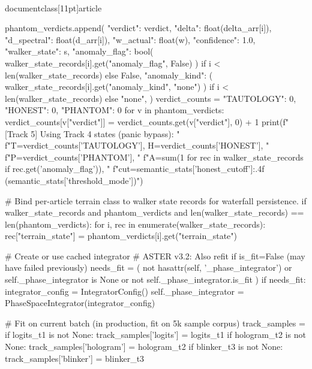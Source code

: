 \\documentclass[11pt]{article}
\begin{document}
\begin{CodeBlock}
                            phantom_verdicts.append({
                                "verdict": verdict,
                                "delta": float(delta_arr[i]),
                                "d_spectral": float(d_arr[i]),
                                "w_actual": float(w),
                                "confidence": 1.0,
                                "walker_state": s,
                                "anomaly_flag": bool(
                                    walker_state_records[i].get("anomaly_flag", False)
                                ) if i < len(walker_state_records) else False,
                                "anomaly_kind": (
                                    walker_state_records[i].get("anomaly_kind", "none")
                                ) if i < len(walker_state_records) else "none",
                            })
                        verdict_counts = {"TAUTOLOGY": 0, "HONEST": 0, "PHANTOM": 0}
                        for v in phantom_verdicts:
                            verdict_counts[v["verdict"]] = verdict_counts.get(v["verdict"], 0) + 1
                        print(f"[Track 5] Using Track 4 states (panic bypass): "
                              f"T={verdict_counts['TAUTOLOGY']}, H={verdict_counts['HONEST']}, "
                              f"P={verdict_counts['PHANTOM']}, "
                              f"A={sum(1 for rec in walker_state_records if rec.get('anomaly_flag'))}, "
                              f"cut={semantic_stats['honest_cutoff']:.4f} ({semantic_stats['threshold_mode']})")

                # Bind per-article terrain class to walker state records for waterfall persistence.
                if walker_state_records and phantom_verdicts and len(walker_state_records) == len(phantom_verdicts):
                    for i, rec in enumerate(walker_state_records):
                        rec["terrain_state"] = phantom_verdicts[i].get("terrain_state")

                # Create or use cached integrator
                # ASTER v3.2: Also refit if is_fit=False (may have failed previously)
                needs_fit = (
                    not hasattr(self, '_phase_integrator') or
                    self._phase_integrator is None or
                    not self._phase_integrator.is_fit
                )
                if needs_fit:
                    integrator_config = IntegratorConfig()
                    self._phase_integrator = PhaseSpaceIntegrator(integrator_config)

                    # Fit on current batch (in production, fit on 5k sample corpus)
                    track_samples = {}
                    if logits_t1 is not None:
                        track_samples['logits'] = logits_t1
                    if hologram_t2 is not None:
                        track_samples['hologram'] = hologram_t2
                    if blinker_t3 is not None:
                        track_samples['blinker'] = blinker_t3


\end{CodeBlock}
\end{document}
